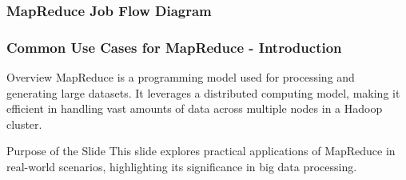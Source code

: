 \documentclass[aspectratio=169]{beamer}
\begin{document}
\begin{frame}[fragile]
    \frametitle{MapReduce Job Flow Diagram}
    \begin{center}
    \end{center}
\end{frame}

\begin{frame}[fragile]
    \frametitle{Common Use Cases for MapReduce - Introduction}
    \begin{block}{Overview}
        MapReduce is a programming model used for processing and generating large datasets. 
        It leverages a distributed computing model, making it efficient in handling vast amounts of data across multiple nodes in a Hadoop cluster.
    \end{block}
    \begin{block}{Purpose of the Slide}
        This slide explores practical applications of MapReduce in real-world scenarios, highlighting its significance in big data processing.
    \end{block}
\end{frame}
\end{document}

